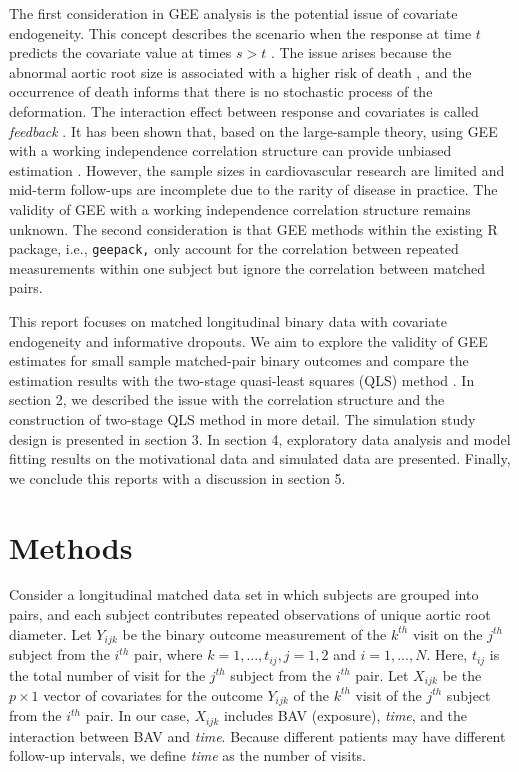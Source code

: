 \documentclass[
]{aft}
\begin{document}
The first consideration in GEE analysis is the potential issue of
covariate endogeneity. This concept describes the scenario when the
response at time \(t\) predicts the covariate value at times \(s > t\)
\citep{Diggle2002}. The issue arises because the abnormal aortic root
size is associated with a higher risk of death \citep{KITAGAWA2013258},
and the occurrence of death informs that there is no stochastic process
of the deformation. The interaction effect between response and
covariates is called \emph{feedback} \citep{Zeger1991}. It has been
shown that, based on the large-sample theory, using GEE with a working
independence correlation structure can provide unbiased estimation
\citep[@LiangZeger1986]{Diggle2002}. However, the sample sizes in
cardiovascular research are limited and mid-term follow-ups are
incomplete due to the rarity of disease in practice. The validity of GEE
with a working independence correlation structure remains unknown. The
second consideration is that GEE methods within the existing R package,
i.e., \texttt{geepack,} only account for the correlation between
repeated measurements within one subject but ignore the correlation
between matched pairs.

This report focuses on matched longitudinal binary data with covariate
endogeneity and informative dropouts. We aim to explore the validity of
GEE estimates for small sample matched-pair binary outcomes and compare
the estimation results with the two-stage quasi-least squares (QLS)
method \citep{Mitani2019}. In section 2, we described the issue with the
correlation structure and the construction of two-stage QLS method in
more detail. The simulation study design is presented in section 3. In
section 4, exploratory data analysis and model fitting results on the
motivational data and simulated data are presented. Finally, we conclude
this reports with a discussion in section 5.

\section{Methods}\label{methods}

Consider a longitudinal matched data set in which subjects are grouped
into pairs, and each subject contributes repeated observations of unique
aortic root diameter. Let \(Y_{ijk}\) be the binary outcome measurement
of the \(k^{th}\) visit on the \(j^{th}\) subject from the \(i^{th}\)
pair, where \(k = 1,...,t_{ij}, j = 1,2\) and \(i = 1,..., N\). Here,
\(t_{ij}\) is the total number of visit for the \(j^{th}\) subject from
the \(i^{th}\) pair. Let \(X_{ijk}\) be the \(p\times 1\) vector of
covariates for the outcome \(Y_{ijk}\) of the \(k^{th}\) visit of the
\(j^{th}\) subject from the \(i^{th}\) pair. In our case, \(X_{ijk}\)
includes BAV (exposure), \emph{time}, and the interaction between BAV
and \emph{time}. Because different patients may have different follow-up
intervals, we define \emph{time} as the number of visits.
\end{document}
